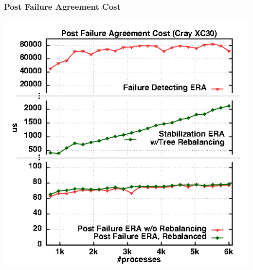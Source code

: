 \begin{frame}
  \frametitle{Post Failure Agreement Cost}

  \centering\includegraphics[height=.8\textheight]{eraaf.pdf}

\end{frame}

